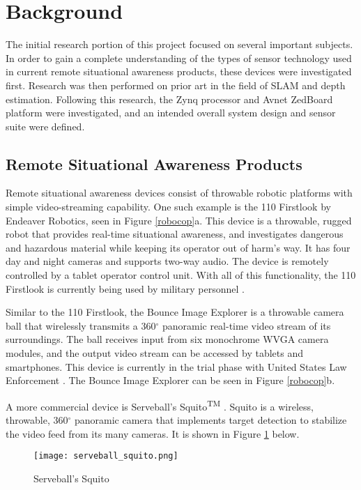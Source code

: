 \section{Background}
The initial research portion of this project focused on several important subjects. In order to gain a complete understanding of the types of sensor technology used in current remote situational awareness products, these devices were investigated first. Research was then performed on prior art in the field of SLAM and depth estimation. Following this research, the Zynq processor and Avnet ZedBoard platform were investigated, and an intended overall system design and sensor suite were defined. 

\subsection{Remote Situational Awareness Products}
Remote situational awareness devices consist of throwable robotic platforms with simple video-streaming capability. One such example is the 110 Firstlook by Endeaver Robotics, seen in Figure \ref{robocop}a. This device is a throwable, rugged robot that provides real-time situational awareness, and investigates dangerous and hazardous material while keeping its operator out of harm's way. It has four day and night cameras and supports two-way audio. The device is remotely controlled by a tablet operator control unit. With all of this functionality, the 110 Firstlook is currently being used by military personnel \cite{endeavor}.
\par
Similar to the 110 Firstlook, the Bounce Image Explorer is a throwable camera ball that wirelessly transmits a 360$^\circ$ panoramic real-time video stream of its surroundings. The ball receives input from six monochrome WVGA camera modules, and the output video stream can be accessed by tablets and smartphones. This device is currently in the trial phase with United States Law Enforcement \cite{bounceImaging}. The Bounce Image Explorer can be seen in Figure \ref{robocop}b.
\par
A more commercial device is Serveball's Squito\textsuperscript{TM} \cite{serveball}. Squito is a wireless, throwable, 360$^{\circ}$ panoramic camera that implements target detection to stabilize the video feed from its many cameras. It is shown in Figure \ref{squito} below.

\begin{figure}[H]
	\centerline{\texttt{[image: serveball\_squito.png]}}
	\caption{Serveball's Squito \cite{serveball}}
	\label{squito}
\end{figure}

